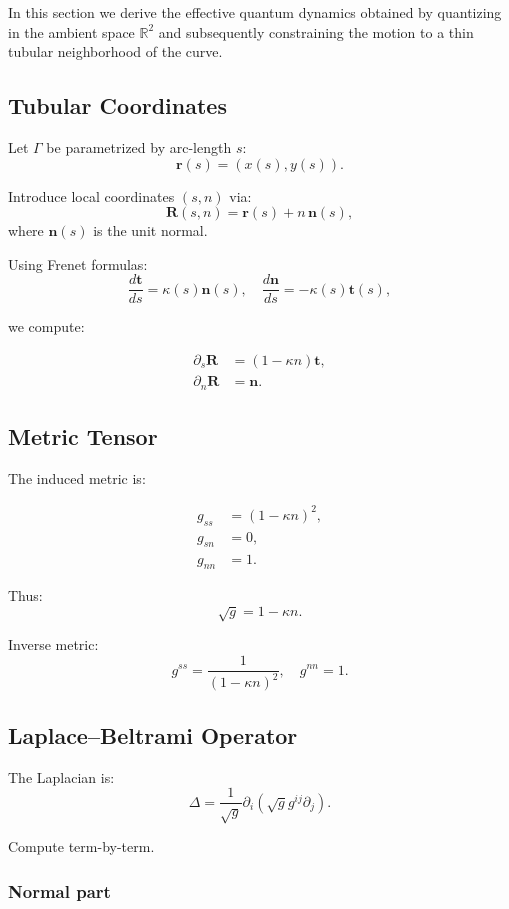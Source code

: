 \documentclass[11pt]{article}
\begin{document}
In this section we derive the effective quantum dynamics obtained by quantizing in the ambient space $\mathbb{R}^2$ and subsequently constraining the motion to a thin tubular neighborhood of the curve.

\subsection{Tubular Coordinates}

Let $\Gamma$ be parametrized by arc-length $s$:
\[
\mathbf{r}(s) = (x(s), y(s)).
\]

Introduce local coordinates $(s,n)$ via:
\[
\mathbf{R}(s,n) = \mathbf{r}(s) + n\,\mathbf{n}(s),
\]
where $\mathbf{n}(s)$ is the unit normal.

Using Frenet formulas:
\[
\frac{d\mathbf{t}}{ds} = \kappa(s)\mathbf{n}(s), \quad
\frac{d\mathbf{n}}{ds} = -\kappa(s)\mathbf{t}(s),
\]

we compute:

\begin{align}
\partial_s \mathbf{R} &= (1 - \kappa n)\mathbf{t}, \\
\partial_n \mathbf{R} &= \mathbf{n}.
\end{align}

\subsection{Metric Tensor}

The induced metric is:

\begin{align}
g_{ss} &= (1 - \kappa n)^2, \\
g_{sn} &= 0, \\
g_{nn} &= 1.
\end{align}

Thus:
\[
\sqrt{g} = 1 - \kappa n.
\]

Inverse metric:
\[
g^{ss} = \frac{1}{(1-\kappa n)^2}, \quad g^{nn}=1.
\]

\subsection{Laplace--Beltrami Operator}

The Laplacian is:
\[
\Delta =
\frac{1}{\sqrt{g}}\partial_i(\sqrt{g} g^{ij}\partial_j).
\]

Compute term-by-term.

\subsubsection{Normal part}
\end{document}
